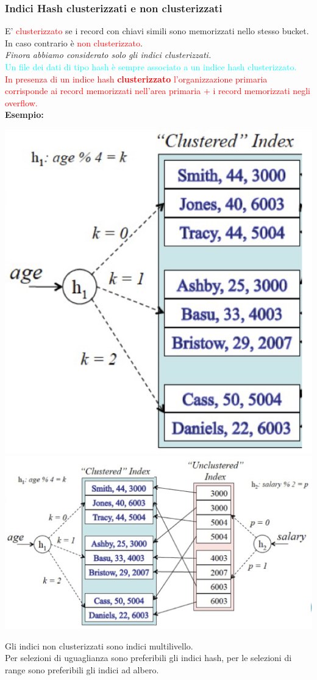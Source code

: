 \documentclass[12pt, a4paper]{report}
\begin{document}
    \subsubsection{Indici Hash clusterizzati e non clusterizzati}
    E' \textcolor{red}{clusterizzato} se i record con chiavi simili sono memorizzati nello stesso bucket. In caso contrario è \textcolor{red}{non clusterizzato}.\\
    \textit{Finora abbiamo considerato solo gli indici clusterizzati.}
    \\\textcolor{Cyan}{Un file dei dati di tipo hash è sempre associato a un indice hash clusterizzato.}
    \\\textcolor{red}{In presenza di un indice hash \textbf{clusterizzato} l'organizzazione primaria corrisponde ai record memorizzati nell'area primaria + i record memorizzati negli overflow.}\\
    \textbf{Esempio:}
    \begin{center}
        \includegraphics[scale=0.5]{Appunti Latex/Immagini/esempioindicihashclusterizzato.png}
        \includegraphics[scale=0.5]{Appunti Latex/Immagini/esempioindicihashnonclusterizzato.png}
    \end{center}
    Gli indici non clusterizzati sono indici multilivello.\\
    Per selezioni di uguaglianza sono preferibili gli indici hash, per le selezioni di range sono preferibili gli indici ad albero.
\end{document}
